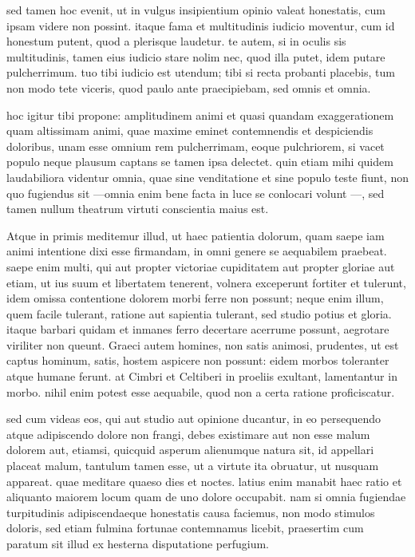  sed tamen hoc evenit, ut in vulgus insipientium opinio valeat honestatis, cum ipsam videre non possint. itaque fama et multitudinis iudicio moventur, cum id honestum putent, quod a plerisque laudetur. te autem, si in oculis sis multitudinis, tamen eius iudicio stare nolim nec, quod illa putet, idem putare pulcherrimum. tuo tibi iudicio est utendum; tibi si recta probanti placebis, tum non modo tete viceris, quod paulo ante praecipiebam, sed omnis et omnia.

 hoc igitur tibi propone: amplitudinem animi et quasi quandam exaggerationem quam altissimam animi, quae maxime eminet contemnendis et despiciendis doloribus, unam esse omnium rem pulcherrimam, eoque pulchriorem, si vacet populo neque plausum captans se tamen ipsa delectet. quin etiam mihi quidem laudabiliora videntur omnia, quae sine venditatione et sine populo teste fiunt, non quo fugiendus sit —omnia enim bene facta in luce se conlocari volunt —, sed tamen nullum theatrum virtuti conscientia maius est.

 Atque in primis meditemur illud, ut haec patientia dolorum, quam saepe iam animi intentione dixi esse firmandam, in omni genere se aequabilem praebeat. saepe enim multi, qui aut propter victoriae cupiditatem aut propter gloriae aut etiam, ut ius suum et libertatem tenerent, volnera exceperunt fortiter et tulerunt, idem omissa contentione dolorem morbi ferre non possunt; neque enim illum, quem facile tulerant, ratione aut sapientia tulerant, sed studio potius et gloria. itaque barbari quidam et inmanes ferro decertare acerrume possunt, aegrotare viriliter non queunt. Graeci autem homines, non satis animosi, prudentes, ut est captus hominum, satis, hostem aspicere non possunt: eidem morbos toleranter atque humane ferunt. at Cimbri et Celtiberi in proeliis exultant, lamentantur in morbo. nihil enim potest esse aequabile, quod non a certa ratione proficiscatur.

 sed cum videas eos, qui aut studio aut opinione ducantur, in eo persequendo atque adipiscendo dolore non frangi, debes existimare aut non esse malum dolorem aut, etiamsi, quicquid asperum alienumque natura sit, id appellari placeat malum, tantulum tamen esse, ut a virtute ita obruatur, ut nusquam appareat. quae meditare quaeso dies et noctes. latius enim manabit haec ratio et aliquanto maiorem locum quam de uno dolore occupabit. nam si omnia fugiendae turpitudinis adipiscendaeque honestatis causa faciemus, non modo stimulos doloris, sed etiam fulmina fortunae contemnamus licebit, praesertim cum paratum sit illud ex hesterna disputatione perfugium.

